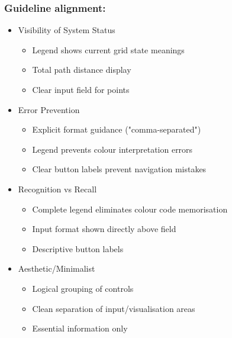 \subsubsection{Guideline alignment:}

    \begin{itemize}
        \item Visibility of System Status
        \begin{itemize}
            \item Legend shows current grid state meanings
            \item Total path distance display
            \item Clear input field for points
    
        \end{itemize}
    \end{itemize}
    
    \begin{itemize}
        \item Error Prevention
        \begin{itemize}
            \item Explicit format guidance ("comma-separated")
            \item Legend prevents colour interpretation errors
            \item Clear button labels prevent navigation mistakes
        \end{itemize}
    \end{itemize}
    
    \begin{itemize}
        \item Recognition vs Recall
    
        \begin{itemize}
            \item Complete legend eliminates colour code memorisation
            \item Input format shown directly above field
            \item Descriptive button labels
        \end{itemize}
    \end{itemize}
    
    
    \begin{itemize}
        \item Aesthetic/Minimalist
    
        \begin{itemize}
            \item Logical grouping of controls
            \item Clean separation of input/visualisation areas
            \item Essential information only
        \end{itemize}
\end{itemize}

